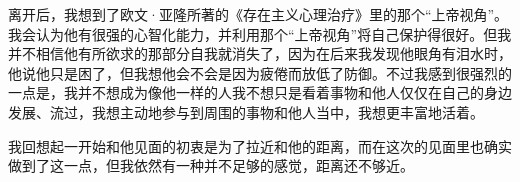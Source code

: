 \tristarsepline

离开后，我想到了欧文·亚隆所著的《存在主义心理治疗》里的那个“上帝视角”。我会认为他有很强的心智化能力，并利用那个“上帝视角”将自己保护得很好。但我并不相信他有所欲求的那部分自我就消失了，因为在后来我发现他眼角有泪水时，他说他只是困了，但我想他会不会是因为疲倦而放低了防御。不过我感到很强烈的一点是，我并不想成为像他一样的人\pozhehao{}我不想只是看着事物和他人仅仅在自己的身边发展、流过，我想主动地参与到周围的事物和他人当中，我想更丰富地活着。

我回想起一开始和他见面的初衷是为了拉近和他的距离，而在这次的见面里也确实做到了这一点，但我依然有一种并不足够的感觉，距离还不够近。
